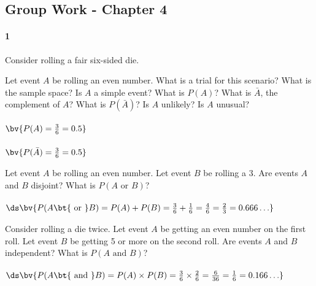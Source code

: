 \documentclass{article}
\begin{document}
\begin{flushleft}
\section*{Group Work - Chapter 4}
\paragraph{1} Consider rolling a fair six-sided die.
\begin{enumalpha}
\item Let event $A$ be rolling an even number. What is a trial for this scenario? What is the sample space? Is $A$ a simple event? What is $P(A)$? What is $\bar A$, the complement of $A$? What is $P(\bar A)$? Is $A$ unlikely? Is $A$ unusual?\\
\medskip
{}\\
$\bv{ P(A) = \frac 3 6 = 0.5}$\\
\\
$\bv{ P(\bar A) = \frac 3 6 = 0.5}$\\

\vspace{.5in}
\item Let event $A$ be rolling an even number. Let event $B$ be rolling a 3. Are events $A$ and $B$ disjoint? What is $P(A \text{ or } B)$?\\
\medskip
{}\\
\medskip $\ds \bv{P(A \text{\bt{ or }} B) = P(A) + P(B) =  \frac 3 6 + \frac 1 6 = \frac 4 6 = \frac 2 3 = 0.666\ldots}$
\vspace{.5in}
\item Consider rolling a die twice. Let event $A$ be getting an even number on the first roll. Let event $B$ be getting 5 or more on the second roll. Are events $A$ and $B$ independent? What is $P(A \text { and } B)$?\\
\medskip
{}\\
\medskip $\ds \bv{P(A \text{\bt{ and }} B) = P(A) \times P(B) = \frac 3 6 \times \frac 2 6 = \frac {6}{36} = \frac 1 6 = 0.166\ldots}$
\end{enumalpha}


\end{flushleft}
\end{document}
